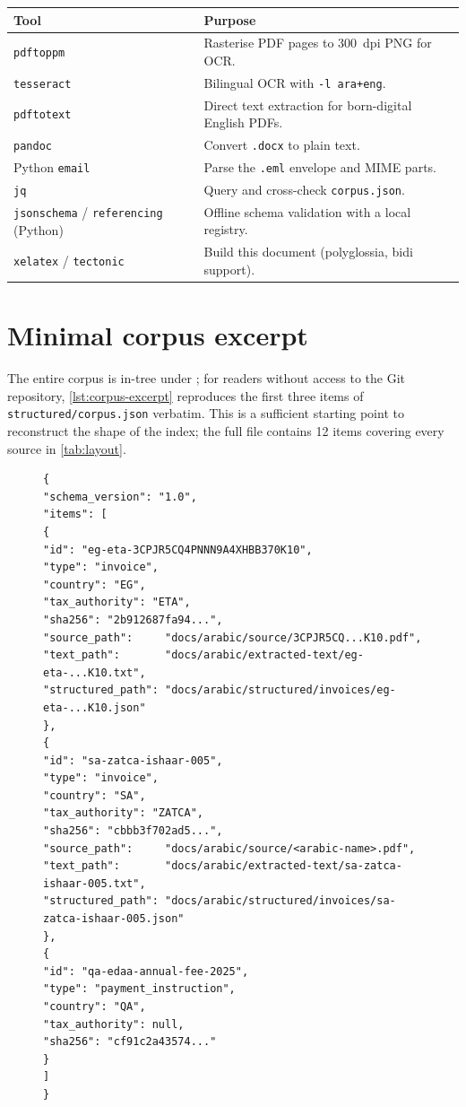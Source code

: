 \documentclass[11pt,a4paper,twoside]{report}
\newcommand{\corpus}{}
\begin{document}
\begin{tabularx}{\linewidth}{@{}l X@{}}
\toprule
\textbf{Tool} & \textbf{Purpose} \\ \midrule
\texttt{pdftoppm}    & Rasterise PDF pages to 300~dpi PNG for OCR. \\
\texttt{tesseract}   & Bilingual OCR with \texttt{-l ara+eng}. \\
\texttt{pdftotext}   & Direct text extraction for born-digital English PDFs. \\
\texttt{pandoc}      & Convert \texttt{.docx} to plain text. \\
Python \texttt{email}& Parse the \texttt{.eml} envelope and MIME parts. \\
\texttt{jq}          & Query and cross-check \texttt{corpus.json}. \\
\texttt{jsonschema} / \texttt{referencing} (Python) & Offline schema validation with a local registry. \\
\texttt{xelatex} / \texttt{tectonic} & Build this document (polyglossia, bidi support). \\
\bottomrule
\end{tabularx}

\section{Minimal corpus excerpt}

The entire corpus is in-tree under \corpus; for readers without
access to the Git repository, \cref{lst:corpus-excerpt} reproduces
the first three items of \corpus\texttt{structured/corpus.json}
verbatim. This is a sufficient starting point to reconstruct the
shape of the index; the full file contains 12 items covering every
source in \cref{tab:layout}.

\begin{figure}[htbp]
\begin{lstlisting}[language=jsonx,caption={First three items of
\texttt{corpus.json}; identical SHA-256 values are reproduced in
\cref{ch:references}.},label=lst:corpus-excerpt]
{
"schema_version": "1.0",
"items": [
{
"id": "eg-eta-3CPJR5CQ4PNNN9A4XHBB370K10",
"type": "invoice",
"country": "EG",
"tax_authority": "ETA",
"sha256": "2b912687fa94...",
"source_path":     "docs/arabic/source/3CPJR5CQ...K10.pdf",
"text_path":       "docs/arabic/extracted-text/eg-eta-...K10.txt",
"structured_path": "docs/arabic/structured/invoices/eg-eta-...K10.json"
},
{
"id": "sa-zatca-ishaar-005",
"type": "invoice",
"country": "SA",
"tax_authority": "ZATCA",
"sha256": "cbbb3f702ad5...",
"source_path":     "docs/arabic/source/<arabic-name>.pdf",
"text_path":       "docs/arabic/extracted-text/sa-zatca-ishaar-005.txt",
"structured_path": "docs/arabic/structured/invoices/sa-zatca-ishaar-005.json"
},
{
"id": "qa-edaa-annual-fee-2025",
"type": "payment_instruction",
"country": "QA",
"tax_authority": null,
"sha256": "cf91c2a43574..."
}
]
}
\end{lstlisting}
\end{figure}
\end{document}
